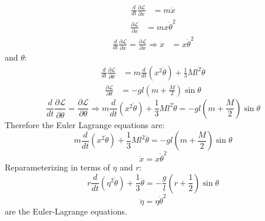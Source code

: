 \documentclass[9pt]{report}
\begin{document}
\begin{enumerate}
\[\begin{align}
\frac{d}{dt} \frac{\partial \mathcal{L}}{\partial\dot{x}} &= m \ddot{x}
\end{align}
\]
\[
\begin{align}
\frac{\partial \mathcal{L}}{\partial x} &= m x \dot{\theta}^2
\end{align}
\]
\[
\begin{align}
 \frac{d}{dt} \frac{\partial \mathcal{L}}{\partial\dot{x}} = \frac{\partial \mathcal{L}}{\partial x} \Rightarrow \ddot{x} &= x \dot{\theta}^2
\end{align}
\]
and $\theta$:
\[
\begin{align}
\frac{d}{dt} \frac{\partial \mathcal{L}}{\partial\dot{\theta}} &= m \frac{d}{dt}(x^2\dot{\theta}) + \frac{1}{3} Ml^2 \ddot{\theta}
\end{align}
\]
\[
\begin{align}
\frac{\partial \mathcal{L}}{\partial \theta} &= -gl (m + \frac{M}{2}) \sin \theta
\end{align}
\]
\[
\frac{d}{dt} \frac{\partial \mathcal{L}}{\partial\dot{\theta}} = \frac{\partial \mathcal{L}}{\partial \theta} \Rightarrow m \frac{d}{dt}(x^2\dot{\theta}) + \frac{1}{3} Ml^2 \ddot{\theta}
= -gl (m + \frac{M}{2}) \sin \theta
\]
Therefore the Euler Lagrange equations are:
\[
m \frac{d}{dt}(x^2\dot{\theta}) + \frac{1}{3} Ml^2 \ddot{\theta} = -gl (m + \frac{M}{2}) \sin \theta \label{el_theta}
\]
\[
\ddot{x} = x \dot{\theta}^2 \label{el_x}
\]
Reparameterizing in terms of $\eta$ and $r$:
\begin{equation}
r \frac{d}{dt}(\eta^2\dot{\theta}) + \frac{1}{3}\ddot{\theta} = -\frac{g}{l} (r + \frac{1}{2}) \sin \theta \label{el_eta}
\end{equation}
\begin{equation}
\ddot{\eta} = \eta \dot{\theta}^2 \label{el_theta}
\end{equation}
are the Euler-Lagrange equations.
\end{enumerate}
\end{document}
